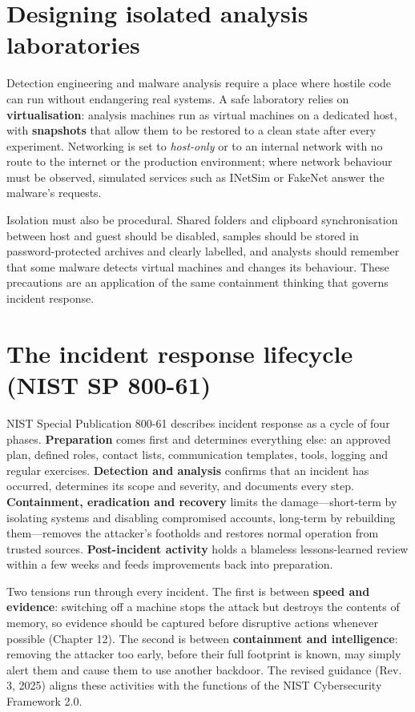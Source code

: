\section{Designing isolated analysis laboratories}\label{sec:11.5}
Detection engineering and malware analysis require a place where hostile code can run without endangering real systems. A safe laboratory relies on \textbf{virtualisation}: analysis machines run as virtual machines on a dedicated host, with \textbf{snapshots} that allow them to be restored to a clean state after every experiment. Networking is set to \emph{host-only} or to an internal network with no route to the internet or the production environment; where network behaviour must be observed, simulated services such as INetSim or FakeNet answer the malware's requests.

Isolation must also be procedural. Shared folders and clipboard synchronisation between host and guest should be disabled, samples should be stored in password-protected archives and clearly labelled, and analysts should remember that some malware detects virtual machines and changes its behaviour. These precautions are an application of the same containment thinking that governs incident response.

\section{The incident response lifecycle (NIST SP 800-61)}\label{sec:11.6}
NIST Special Publication 800-61 describes incident response as a cycle of four phases. \textbf{Preparation} comes first and determines everything else: an approved plan, defined roles, contact lists, communication templates, tools, logging and regular exercises. \textbf{Detection and analysis} confirms that an incident has occurred, determines its scope and severity, and documents every step. \textbf{Containment, eradication and recovery} limits the damage—short-term by isolating systems and disabling compromised accounts, long-term by rebuilding them—removes the attacker's footholds and restores normal operation from trusted sources. \textbf{Post-incident activity} holds a blameless lessons-learned review within a few weeks and feeds improvements back into preparation.

Two tensions run through every incident. The first is between \textbf{speed and evidence}: switching off a machine stops the attack but destroys the contents of memory, so evidence should be captured before disruptive actions whenever possible (Chapter 12). The second is between \textbf{containment and intelligence}: removing the attacker too early, before their full footprint is known, may simply alert them and cause them to use another backdoor. The revised guidance (Rev. 3, 2025) aligns these activities with the functions of the NIST Cybersecurity Framework 2.0.

